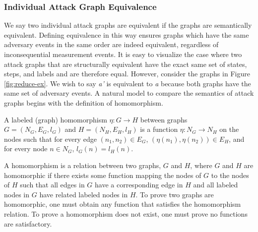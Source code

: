 \documentclass[runningheads]{llncs}
\theoremstyle{definition}
\begin{document}
\subsubsection*{Individual Attack Graph Equivalence}

We say two individual attack graphs are equivalent if the graphs are semantically equivalent. Defining equivalence in this way ensures graphs which have the same adversary events in the same order are indeed equivalent, regardless of inconsequential measurement events. It is easy to visualize the case where two attack graphs that are structurally equivalent have the exact same set of states, steps, and labels and are therefore equal. However, consider the graphs in Figure \ref{fig:reduce-ex}. We wish to say \emph{a'} is equivalent to \emph{a} because both graphs have the same set of adversary events. A natural model to compare the semantics of attack graphs begins with the definition of homomorphism.





\begin{definition}[Homomorphism]
    A labeled (graph) homomorphism $\eta : G \to H$ between graphs \\ $G = (N_G, E_G, l_G)$ and $H = (N_H, E_H, l_H)$ is a function $\eta : N_G \to N_H$ on the nodes such that for every edge $(n_1, n_2) \in E_G$, $(\eta(n_1), \eta(n_2)) \in E_H$, and for every node $n \in N_G$, $l_G(n) = l_H(n)$.  \cite{Rowe:2021:OnOrdering}
\end{definition}

A homomorphism is a relation between two graphs, $G$ and $H$, where $G$ and $H$ are homomorphic if there exists some function mapping the nodes of $G$ to the nodes of $H$ such that all edges in $G$ have a corresponding edge in $H$ and all labeled nodes in $G$ have related labeled nodes in $H$. To prove two graphs are homomorphic, one must obtain any function that satisfies the homomorphism relation. To prove a homomorphism does not exist, one must prove no functions are satisfactory. 
\end{document}
